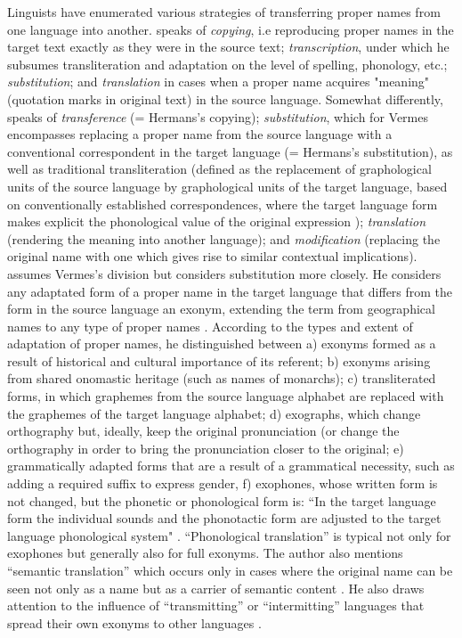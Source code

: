 \documentclass[output=paper,colorlinks,citecolor=brown,arabicfont,chinesefont]{langscibook}
\begin{document}
Linguists have enumerated various strategies of transferring proper names from one language into another. \citet{Hermans2015} speaks of \emph{copying}, i.e reproducing proper names in the target text exactly as they were in the source text; \emph{transcription}, under which he subsumes transliteration and adaptation on the level of spelling, phonology, etc.; \emph{substitution}; and \emph{translation} in cases when a proper name acquires "meaning" (quotation marks in original text) in the source language. Somewhat differently, \citet{Vermes2003} speaks of \emph{transference} (= Hermans's copying); \emph{substitution}, which for Vermes encompasses replacing a proper name from the source language with a conventional correspondent in the target language (= Hermans's substitution), as well as traditional transliteration (defined as the replacement of graphological units of the source language by graphological units of the target language, based on conventionally established correspondences, where the target language form makes explicit the phonological value of the original expression \citep[93]{Vermes2003}); \emph{translation} (rendering the meaning into another language); and \emph{modification} (replacing the original name with one which gives rise to similar contextual implications). \citet{Raukko2017} assumes Vermes's division but considers substitution more closely. He considers any adaptated form of a proper name in the target language that differs from the form in the source language an exonym, extending the term from geographical names to any type of proper names \citep[97]{Raukko2017}. According to the types and extent of adaptation of proper names, he distinguished between a) exonyms formed as a result of historical and cultural importance of its referent; b) exonyms arising from shared onomastic heritage (such as names of monarchs); c) transliterated forms, in which graphemes from the source language alphabet are replaced with the graphemes of the target language alphabet; d) exographs, which change orthography but, ideally, keep the original pronunciation (or change the orthography in order to bring the pronunciation closer to the original; e) grammatically adapted forms that are a result of a grammatical necessity, such as adding a required suffix to express gender, f) exophones, whose written form is not changed, but the phonetic or phonological form is: ``In the target language form the individual sounds and the phonotactic form are adjusted to the target language phonological system" \citep[99]{Raukko2017}. “Phonological translation” is typical not only for exophones but generally also for full exonyms. The author also mentions “semantic translation” which occurs only in cases where the original name can be seen not only as a name but as a carrier of semantic content \citep[108]{Raukko2017}. He also draws attention to the influence of “transmitting” or “intermitting” languages that spread their own exonyms to other languages \citep[106]{Raukko2017}.
\end{document}
